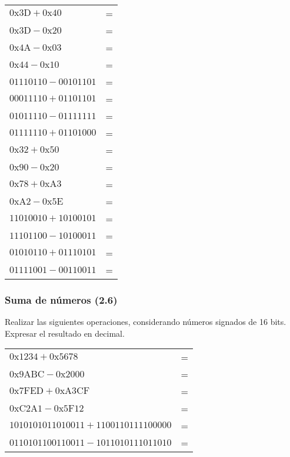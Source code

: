 \begin{tabular}{lc}
  $\mathrm{0x3D} + \mathrm{0x40} $&=\underspace\\
  $\mathrm{0x3D} - \mathrm{0x20} $&=\underspace\\
  $\mathrm{0x4A} - \mathrm{0x03} $&=\underspace\\
  $\mathrm{0x44} - \mathrm{0x10} $&=\underspace\\
  $\mathrm{01110110} - \mathrm{00101101}$&=\underspace\\
  $\mathrm{00011110} + \mathrm{01101101}$&=\underspace\\
  $\mathrm{01011110} - \mathrm{01111111}$&=\underspace\\
  $\mathrm{01111110} + \mathrm{01101000}$&=\underspace\\
  $\mathrm{0x32} + \mathrm{0x50}$&=\underspace\\
  $\mathrm{0x90} - \mathrm{0x20}$&=\underspace\\
  $\mathrm{0x78} + \mathrm{0xA3}$&=\underspace\\
  $\mathrm{0xA2} - \mathrm{0x5E}$&=\underspace\\
  $\mathrm{11010010} + \mathrm{10100101}$&=\underspace\\
  $\mathrm{11101100} - \mathrm{10100011}$&=\underspace\\
  $\mathrm{01010110} + \mathrm{01110101}$&=\underspace\\
  $\mathrm{01111001} - \mathrm{00110011}$&=\underspace\\

\end{tabular}


\subsubsection{Suma de números (2.6)}
Realizar las siguientes operaciones, considerando números signados de 16 bits. Expresar el resultado en decimal.

\vspace{10mm}
\begin{tabular}{lc}
  $\mathrm{0x1234} + \mathrm{0x5678}$&=\underspace\\
  $\mathrm{0x9ABC} - \mathrm{0x2000}$&=\underspace\\
  $\mathrm{0x7FED} + \mathrm{0xA3CF}$&=\underspace\\
  $\mathrm{0xC2A1} - \mathrm{0x5F12}$&=\underspace\\
  $\mathrm{10101010 11010011} + \mathrm{11001101 11100000}$&=\underspace\\
  $\mathrm{01101011 00110011} - \mathrm{10110101 11011010}$&=\underspace\\
\end{tabular}

